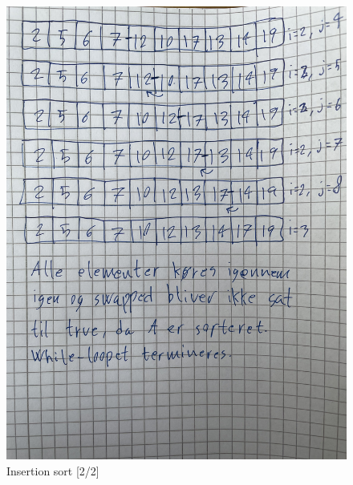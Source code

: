 \documentclass[a4paper,12pt]{article}
\begin{document}
\begin{figure}[H]
    \centering
    \includegraphics[width=1.08\textwidth, angle=-90]{IMG_2073.jpg}
    \caption{Insertion sort [2/2]}
\end{figure}
\end{document}
